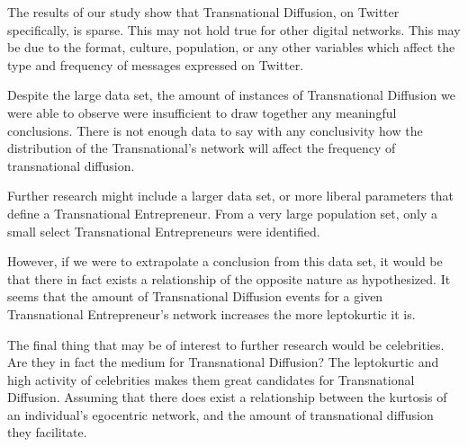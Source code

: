 The results of our study show that Transnational Diffusion, on Twitter
specifically, is sparse. This may not hold true for other digital
networks. This may be due to the format, culture, population, or any
other variables which affect the type and frequency of messages
expressed on Twitter.

Despite the large data set, the amount of instances of Transnational
Diffusion we were able to observe were insufficient to draw together
any meaningful conclusions. There is not enough data to say with any
conclusivity how the distribution of the Transnational's network will
affect the frequency of transnational diffusion.

Further research might include a larger data set, or more liberal
parameters that define a Transnational Entrepreneur. From a very large
population set, only a small select Transnational Entrepreneurs were
identified.

However, if we were to extrapolate a conclusion from this data set, it
would be that there in fact exists a relationship of the opposite
nature as hypothesized. It seems that the amount of Transnational
Diffusion events for a given Transnational Entrepreneur's network
increases the more leptokurtic it is.

The final thing that may be of interest to further research would be
celebrities. Are they in fact the medium for Transnational Diffusion?
The leptokurtic and high activity of celebrities makes them great
candidates for Transnational Diffusion. Assuming that there does exist
a relationship between the kurtosis of an individual's egocentric
network, and the amount of transnational diffusion they facilitate.